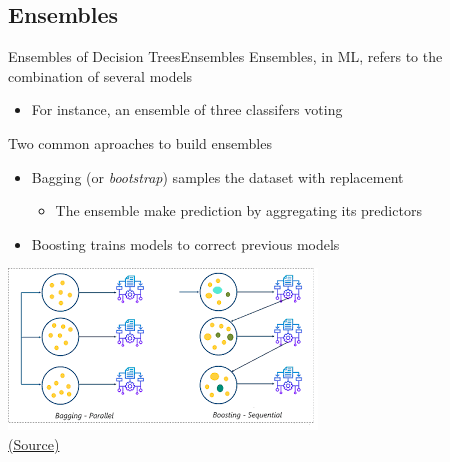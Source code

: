 \documentclass[10pt,compress]{beamer} %
\begin{document}
\subsection{Ensembles}
\begin{frame}{Ensembles of Decision Trees}{Ensembles}
    \alert{Ensembles}, in ML, refers to the combination of several models
    \begin{itemize}
        \item For instance, an ensemble of three classifers voting
    \end{itemize}

    Two common aproaches to build ensembles
    \begin{itemize}
        \item \alert{Bagging} (or \textit{bootstrap}) samples the dataset with replacement
            \begin{itemize}
                \item The ensemble make prediction by aggregating its predictors
            \end{itemize}
        \item \alert{Boosting} trains models to correct previous models
   \end{itemize}

    \centering \includegraphics[width=0.5\linewidth]{figs/baggingboosting.png}\\
    \centering\tiny{\href{https://medium.com/@maniyaswanth123/bagging-and-boosting-a0b39e312117}{(Source)}}
\end{frame}
\end{document}
